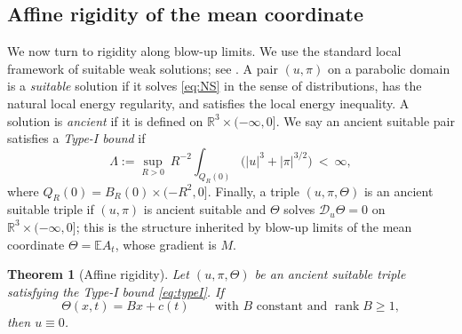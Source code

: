 \documentclass[11pt,reqno]{amsart}
\newcommand{\R}{\mathbb{R}}
\newcommand{\E}{\mathbb{E}}
\newcommand{\abs}[1]{\left\lvert #1\right\rvert}
\DeclareMathOperator{\rank}{rank}
\newtheorem{theorem}{Theorem}[section]
\theoremstyle{definition}
\begin{document}
\subsection{Affine rigidity of the mean coordinate}

We now turn to rigidity along blow-up limits. We use the standard local framework of
suitable weak solutions; see \cite{CaffarelliKohnNirenberg1982}. A pair $(u,\pi)$ on a
parabolic domain is a \emph{suitable} solution if it solves \eqref{eq:NS} in the sense of
distributions, has the natural local energy regularity, and satisfies the local energy
inequality. A solution is \emph{ancient} if it is defined on $\R^3\times(-\infty,0]$. We
say an ancient suitable pair satisfies a \emph{Type-I bound} if
\begin{equation}\label{eq:typeI}
  \Lambda:=\sup_{R>0}\ R^{-2}\int_{Q_R(0)}\bigl(\abs u^3+\abs\pi^{3/2}\bigr)\ <\ \infty ,
\end{equation}
where $Q_R(0)=B_R(0)\times(-R^2,0]$. Finally, a triple $(u,\pi,\Theta)$ is an ancient
suitable triple if $(u,\pi)$ is ancient suitable and $\Theta$ solves
$\mathcal D_u\Theta=0$ on $\R^3\times(-\infty,0]$; this is the structure inherited by
blow-up limits of the mean coordinate $\Theta=\E A_t$, whose gradient is $M$.

\begin{theorem}[Affine rigidity]\label{thm:rigidity}
Let $(u,\pi,\Theta)$ be an ancient suitable triple satisfying the Type-I bound
\eqref{eq:typeI}. If
\[
  \Theta(x,t)=Bx+c(t)\qquad\text{with }B\text{ constant and }\rank B\ge1,
\]
then $u\equiv0$.
\end{theorem}
\end{document}
